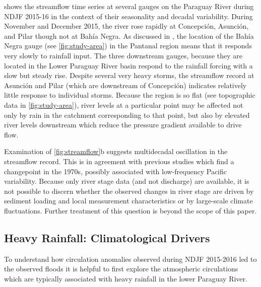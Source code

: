 \documentclass{ametsoc}
\begin{document}
 shows the streamflow time series at several gauges on the Paraguay River during NDJF 2015-16 in the context of their seasonality and decadal variability.
During November and December 2015, the river rose rapidly at Concepci\'on, Asunci\'on, and Pilar though not at Bah\'ia Negra.
As discussed in \citet{Bravo:2011et,Barros:2004bn}, the location of the Bah\'ia Negra gauge (see \cref{fig:study-area}) in the Pantanal region means that it responds very slowly to rainfall input.
The three downstream gauges, because they are located in the Lower Paraguay River basin respond to the rainfall forcing with a slow but steady rise.
Despite several very heavy storms, the streamflow record at Asunci\'on and Pilar (which are downstream of Concepci\'on) indicates relatively little response to individual storms.
Because the region is so flat (see topographic data in \cref{fig:study-area}), river levels at a particular point may be affected not only by rain in the catchment corresponding to that point, but also by elevated river levels downstream which reduce the pressure gradient available to drive flow.

Examination of \cref{fig:streamflow}b suggests multidecadal oscillation in the streamflow record.
This is in agreement with previous studies \citep{Collischonn:2001bi,Carvalho2011} which find a changepoint in the 1970s, possibly associated with low-frequency Pacific variability.
Because only river stage data (and not discharge) are available, it is not possible to discern whether the observed changes in river stage are driven by sediment loading and local measurement characteristics or by large-scale climate fluctuations.
Further treatment of this question is beyond the scope of this paper.

\subsection{Heavy Rainfall: Climatological Drivers} \label{sec:rainfall-circulation}

To understand how circulation anomalies observed during NDJF 2015-2016 led to the observed floods it is helpful to first explore the atmospheric circulations which are typically associated with heavy rainfall in the lower Paraguay River.
\end{document}
